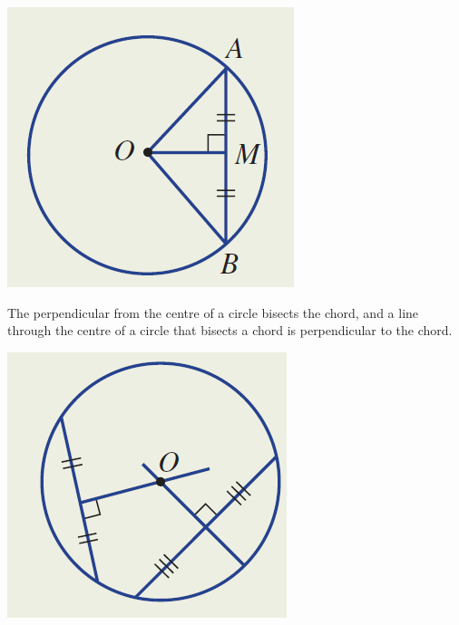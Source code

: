 \documentclass{report}
\begin{document}
{\noindent\begin{minipage}{0.3\textwidth}%
    \includegraphics[width=\linewidth]{chordperp.png}
\end{minipage}%
        \hfill%
\begin{minipage}{0.6\textwidth}\raggedright
    The perpendicular from the centre of a circle bisects the chord, and a line through the centre of a circle that bisects a chord
    is perpendicular to the chord.
\end{minipage}
\noindent\begin{minipage}{0.3\textwidth}%
    \includegraphics[width=\linewidth]{chordbisect.png}

\end{minipage}}
\end{document}
